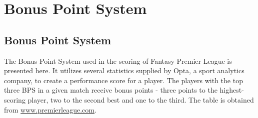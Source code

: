 

\appendix

\renewcommand{\thechapter}{\Alph{chapter}}


\chapter{Bonus Point System}
\section{Bonus Point System}\label{A1_BPS}

The Bonus Point System used in the scoring of Fantasy Premier League is presented here. It utilizes several statistics supplied by Opta, a sport analytics company, to create a performance score for a player. The players with the top three BPS in a given match receive bonus points - three points to the highest-scoring player, two to the second best and one to the third. The table is obtained from \url{www.premierleague.com}. 

